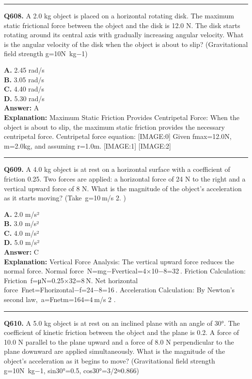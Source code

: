 \documentclass[12pt]{article}
\begin{document}
\hrule
\vspace{1em}


\noindent
\textbf{Q608.} A 2.0 kg object is placed on a horizontal rotating disk. The maximum static frictional force between the object and the disk is 12.0 N. The disk starts rotating around its central axis with gradually increasing angular velocity. What is the angular velocity of the disk when the object is about to slip? (Gravitational field strength g=10N kg−1)



\textbf{A.} 2.45 rad/s \\
\textbf{B.} 3.05 rad/s \\
\textbf{C.} 4.40 rad/s \\
\textbf{D.} 5.30 rad/s \\

\textbf{Answer:} A \\
\textbf{Explanation:} Maximum Static Friction Provides Centripetal Force:
When the object is about to slip, the maximum static friction provides the necessary centripetal force. Centripetal force equation:
[IMAGE:0]
Given fmax​=12.0N, m=2.0kg, and assuming r=1.0m.
[IMAGE:1]
[IMAGE:2]

\hrule
\vspace{1em}


\noindent
\textbf{Q609.} A 4.0 kg object is at rest on a horizontal surface with a coefficient of friction 0.25. Two forces are applied: a horizontal force of 24 N to the right and a vertical upward force of 8 N. What is the magnitude of the object’s acceleration as it starts moving? (Take g=10 m/s
2.
)



\textbf{A.} 2.0 m/s² \\
\textbf{B.} 3.0 m/s² \\
\textbf{C.} 4.0 m/s² \\
\textbf{D.} 5.0 m/s² \\

\textbf{Answer:} C \\
\textbf{Explanation:} Vertical Force Analysis: The vertical upward force reduces the normal force.
Normal force N=mg−Fvertical=4×10−8=32 .
Friction Calculation: Friction f=μN=0.25×32=8 N.
Net horizontal force Fnet=Fhorizontal−f=24−8=16 .
Acceleration Calculation: By Newton’s second law, a=Fnetm=164=4 m/s
2
.

\hrule
\vspace{1em}


\noindent
\textbf{Q610.} A 5.0 kg object is at rest on an inclined plane with an angle of 30°. The coefficient of kinetic friction between the object and the plane is 0.2. A force of 10.0 N parallel to the plane upward and a force of 8.0 N perpendicular to the plane downward are applied simultaneously. What is the magnitude of the object's acceleration as it begins to move? (Gravitational field strength g=10N kg−1, sin30°=0.5, cos30°=3​/2≈0.866)
\end{document}
